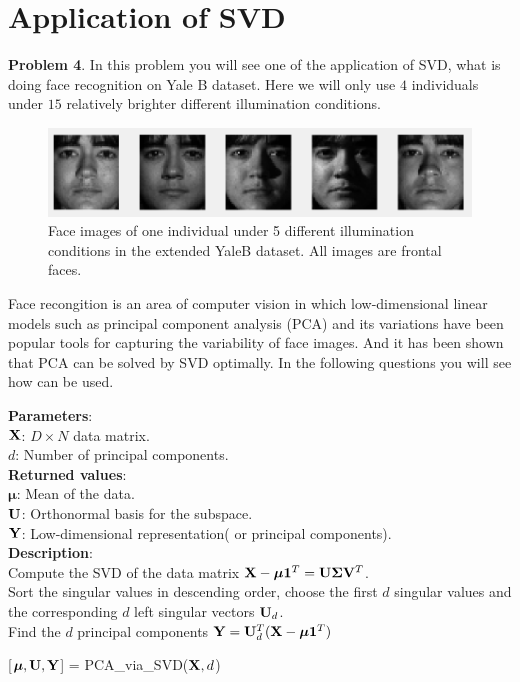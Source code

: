 \documentclass[english,onecolumn]{IEEEtran}
\newcommand{\bV}{{\bf V}}
\newcommand{\bY}{{\bf Y}}
\newcommand{\bX}{{\bf X}}
\newcommand{\bmu}{{\boldsymbol \mu}}
\newcommand{\bSig}{{\boldsymbol \Sigma}}
\newcommand{\bone}{{\boldsymbol 1}}
\newcommand{\bU}{{\bf U}}
\begin{document}
\newpage
\section{Application of SVD}
\noindent\textbf{Problem 4}.
In this problem you will see one of the application of SVD, what is doing face recognition on Yale B dataset. Here we will only use $4$ individuals under $15$ relatively brighter different illumination conditions.

\begin{figure}[h]
    \centering
    \includegraphics{figures/example_face.png}
    \caption{Face images of one individual under 5 different illumination conditions in the extended YaleB dataset. All images are frontal faces.}
    \label{fig:my_label}
\end{figure}
\vspace{-0.3cm}
Face recongition is an area of computer vision in which low-dimensional linear models such as principal component analysis (PCA) and its variations have been popular tools for capturing the variability of face images. And it has been shown that PCA can be solved by SVD optimally. In the following questions you will see how  can be used.

\vspace{0.5cm}
\begin{algorithm}[H]
\textbf{Parameters}:\\
$\bX$: \quad $D\times N $ data matrix.\\
$d$: \quad Number of principal components.\\
\textbf{Returned values}:\\
$\bmu$: \quad Mean of the data.\\
$\bU$: \quad Orthonormal basis for the subspace.\\
$\bY$: \quad Low-dimensional representation( or principal components).\\
\textbf{Description}:\\
Compute the SVD of the data matrix $\bX - \bmu \bone^T = \bU \bSig \bV^T$.\\
Sort the singular values in descending order, choose the first $d$ singular values and the corresponding $d$ left singular vectors $\bU_d$.\\
Find the $d$ principal components $\bY = \bU_d^T(\bX - \bmu \bone^T)$
\caption{[$\bmu, \bU, \bY$] = PCA\_via\_SVD($\bX,d$) }
\label{Alg:PCA}
\end{algorithm}
\vspace{0.5cm}
\end{document}
